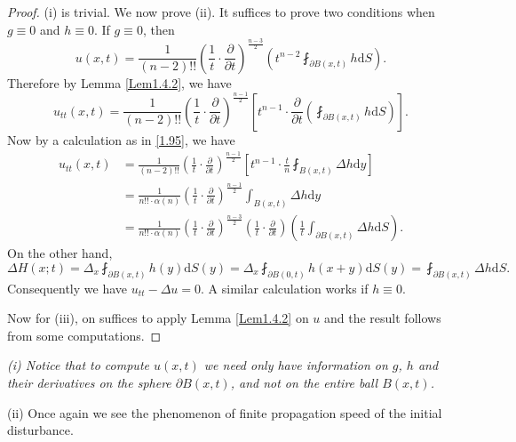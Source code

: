 \begin{proof}
(i) is trivial. We now prove (ii). It suffices to prove two conditions when $g\equiv 0$ and $h\equiv 0$. If $g\equiv 0$, then 
$$
u\left( x,t \right) =\frac{1}{\left( n-2 \right) !!}\left( \frac{1}{t}\cdot \frac{\partial}{\partial t} \right) ^{\frac{n-3}{2}}\left( t^{n-2}\fint_{\partial B\left( x,t \right)}{h\mathrm{d}S} \right) .
$$
Therefore by Lemma \ref{Lem1.4.2}, we have 
$$
u_{tt}\left( x,t \right) =\frac{1}{\left( n-2 \right) !!}\left( \frac{1}{t}\cdot \frac{\partial}{\partial t} \right) ^{\frac{n-1}{2}}\left[ t^{n-1}\cdot \frac{\partial}{\partial t}\left( \fint_{\partial B\left( x,t \right)}{h\mathrm{d}S} \right) \right] .
$$
Now by a calculation as in \eqref{1.95}, we have 
$$
\begin{aligned}
u_{tt}\left( x,t \right) &=\frac{1}{\left( n-2 \right) !!}\left( \frac{1}{t}\cdot \frac{\partial}{\partial t} \right) ^{\frac{n-1}{2}}\left[ t^{n-1}\cdot \frac{t}{n}\fint_{B\left( x,t \right)}{\Delta h\mathrm{d}y} \right] 
\\
&=\frac{1}{n!!\cdot \alpha \left( n \right)}\left( \frac{1}{t}\cdot \frac{\partial}{\partial t} \right) ^{\frac{n-1}{2}}\int_{B\left( x,t \right)}{\Delta h\mathrm{d}y}
\\
&=\frac{1}{n!!\cdot \alpha \left( n \right)}\left( \frac{1}{t}\cdot \frac{\partial}{\partial t} \right) ^{\frac{n-3}{2}}\left( \frac{1}{t}\cdot \frac{\partial}{\partial t} \right) \left( \frac{1}{t}\int_{\partial B\left( x,t \right)}{\Delta h\mathrm{d}S} \right) .
\end{aligned}
$$
On the other hand, 
$$
\Delta H\left( x;t \right) =\Delta _x\fint_{\partial B\left( x,t \right)}{h\left( y \right) \mathrm{d}S\left( y \right)}=\Delta _x\fint_{\partial B\left( 0,t \right)}{h\left( x+y \right) \mathrm{d}S\left( y \right)}=\fint_{\partial B\left( x,t \right)}{\Delta h\mathrm{d}S}.
$$
Consequently we have $u_{tt}-\Delta u=0$. A similar calculation works if $h\equiv 0$.\par
Now for (iii), on suffices to apply Lemma \ref{Lem1.4.2} on $u$ and the result follows from some computations.
\end{proof}
\begin{note}\em
(i) Notice that to compute $u(x,t)$ we need only have information on $g$, $h$ and their derivatives on the sphere $\partial B(x,t)$, and not on the entire ball $B(x,t)$.\par
(ii) Once again we see the phenomenon of finite propagation speed of the initial disturbance.
\end{note} 
